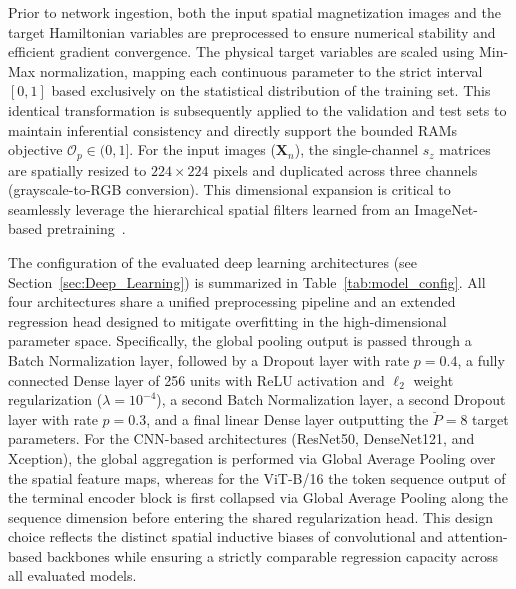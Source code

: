 \documentclass[final,5p,times,twocolumn]{elsarticle}
\begin{document}
Prior to network ingestion, both the input spatial 
magnetization images and the target Hamiltonian 
variables are preprocessed to ensure numerical 
stability and efficient gradient convergence. The 
physical target variables are scaled using Min-Max 
normalization, mapping each continuous parameter to 
the strict interval $[0,1]$ based exclusively on the 
statistical distribution of the training set. This 
identical transformation is subsequently applied to 
the validation and test sets to maintain inferential 
consistency and directly support the bounded RAMs 
objective $\mathcal{O}_p \in (0,1]$. For the input 
images ($\mathbf{X}_n$), the single-channel $s_z$ 
matrices are spatially resized to $224 \times 224$ 
pixels and duplicated across three channels 
(grayscale-to-RGB conversion). This dimensional 
expansion is critical to seamlessly leverage the 
hierarchical spatial filters learned from an 
ImageNet-based pretraining~\cite{radosavovic2023real}.

The configuration of the evaluated deep learning 
architectures (see Section~\ref{sec:Deep_Learning}) 
is summarized in Table~\ref{tab:model_config}. All 
four architectures share a unified preprocessing 
pipeline and an extended regression head designed 
to mitigate overfitting in the high-dimensional 
parameter space. Specifically, the global pooling 
output is passed through a Batch Normalization layer, 
followed by a Dropout layer with rate $p = 0.4$, a 
fully connected Dense layer of 256 units with ReLU 
activation and $\ell_2$ weight regularization 
($\lambda = 10^{-4}$), a second Batch Normalization 
layer, a second Dropout layer with rate $p = 0.3$, 
and a final linear Dense layer outputting the 
$\breve{P} = 8$ target parameters. For the 
CNN-based architectures (ResNet50, DenseNet121, and 
Xception), the global aggregation is performed via 
Global Average Pooling over the spatial feature maps, 
whereas for the ViT-B/16 the token sequence output 
of the terminal encoder block is first collapsed via 
Global Average Pooling along the sequence dimension 
before entering the shared regularization head. This 
design choice reflects the distinct spatial inductive 
biases of convolutional and attention-based backbones 
while ensuring a strictly comparable regression 
capacity across all evaluated models.
\end{document}
